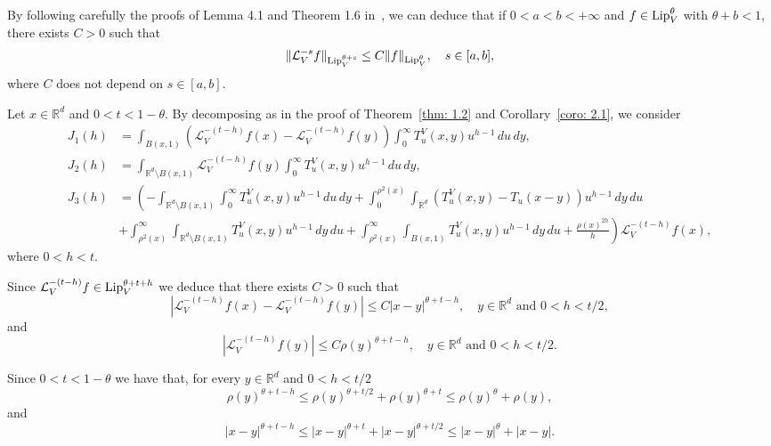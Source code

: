 \documentclass[10pt, a4paper, reqno]{amsart}
\theoremstyle{definition}
\theoremstyle{remark}
\newcommand{\RR}{\mathbb{R}}
\numberwithin{equation}{section}
\begin{document}
By following carefully the proofs of Lemma 4.1 and Theorem 1.6 in~\cite{dLT}, we can deduce that if $0 < a < b < +\infty$ and $f \in \textup{Lip}^\theta_V$ with $\theta + b < 1$, there exists $C > 0$ such that
\begin{equation}\label{eq: 3.7}
    \|\mathcal{L}_V^{-s} f\|_{\textup{Lip}_V^{\theta+s}} \leq C \|f\|_{\textup{Lip}_V^{\theta}}, \quad s \in [a,b],
\end{equation}
where $C$ does not depend on $s \in [a,b]$. 

Let $x \in \mathbb{R}^d$ and $0 < t < 1-\theta$. By decomposing as in the proof of Theorem~\ref{thm: 1.2} and Corollary~\ref{coro: 2.1}, we consider
\begin{equation*}
    \begin{split}
        J_1(h) & = \int_{B(x,1)} \left( \mathcal{L}_V^{-(t-h)} f(x) - \mathcal{L}_V^{-(t-h)} f(y) \right) \int_0^\infty T_u^V(x,y) u^{h-1} \, du \, dy, \\
        J_2(h) & = \int_{\mathbb{R}^d \setminus B(x,1)} \mathcal{L}_V^{-(t-h)} f(y) \int_0^\infty T_u^V(x,y) u^{h-1} \, du \, dy, \\
        J_3(h) & = \left( - \int_{\mathbb{R}^d \setminus B(x,1)} \int_0^\infty T_u^V(x,y) u^{h-1} \, du \, dy 
        + \int_{0}^{\rho^2(x)} \int_{\mathbb{R}^d} \left( T_u^V(x,y) - T_u(x-y) \right) u^{h-1} \, dy \, du \right. \\
        &  + \left. \int_{\rho^2(x)}^\infty \int_{\mathbb{R}^d \setminus B(x,1)} T_u^V(x,y) u^{h-1} \, dy \, du
        + \int_{\rho^2(x)}^\infty \int_{B(x,1)} T_u^V(x,y) u^{h-1} \, dy \, du
        + \frac{\rho(x)^{2h}}{h} \right) \mathcal{L}_V^{-(t-h)} f(x),
    \end{split}
\end{equation*}
where $0 < h < t$.


Since $\mathcal{L}_V^{-(t-h)} f\in \textup{Lip}_V^{\theta+t+h}$ we deduce that there exists $C>0$ such that
\begin{equation*}
    |\mathcal{L}_V^{-(t-h)} f(x) - \mathcal{L}_V^{-(t-h)} f(y)| \leq C |x-y|^{\theta + t - h}, \quad y\in \RR^d \text{ and } 0<h<t/2,
\end{equation*}
and
\begin{equation*}
    |\mathcal{L}_V^{-(t-h)} f(y)| \leq C \rho(y)^{\theta+t-h}, \quad y\in \RR^d \text{ and } 0<h<t/2.
\end{equation*}

Since $0<t<1-\theta$ we have that, for every $y\in \RR^d$ and $0<h<t/2$
\begin{equation*}
    \rho(y)^{\theta+t-h} \leq \rho(y)^{\theta +t/2} + \rho(y)^{\theta+t} \leq \rho(y)^\theta + \rho(y),
\end{equation*}
and 
\begin{equation*}
    |x-y|^{\theta +t -h } \leq |x-y|^{\theta +t} + |x-y|^{\theta+t/2} \leq |x-y|^\theta + |x-y|.
\end{equation*}
\end{document}
